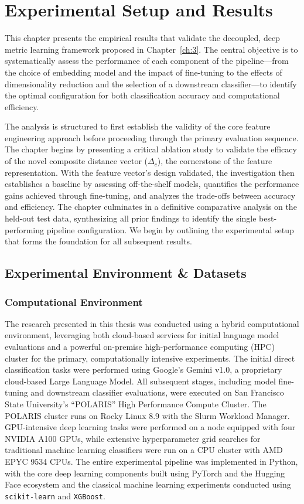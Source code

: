 \chapter{Experimental Setup and Results}\label{ch:4}
This chapter presents the empirical results that validate the decoupled, deep metric learning framework proposed in Chapter~\ref{ch:3}. The central objective is to systematically assess the performance of each component of the pipeline—from the choice of embedding model and the impact of fine-tuning to the effects of dimensionality reduction and the selection of a downstream classifier—to identify the optimal configuration for both classification accuracy and computational efficiency.

The analysis is structured to first establish the validity of the core feature engineering approach before proceeding through the primary evaluation sequence. The chapter begins by presenting a critical ablation study to validate the efficacy of the novel composite distance vector (\(\Delta_c\)), the cornerstone of the feature representation. With the feature vector's design validated, the investigation then establishes a baseline by assessing off-the-shelf models, quantifies the performance gains achieved through fine-tuning, and analyzes the trade-offs between accuracy and efficiency. The chapter culminates in a definitive comparative analysis on the held-out test data, synthesizing all prior findings to identify the single best-performing pipeline configuration. We begin by outlining the experimental setup that forms the foundation for all subsequent results.

\section{Experimental Environment \& Datasets}\label{ch:4.1}

\subsection{Computational Environment}\label{ch:4.1.1}
The research presented in this thesis was conducted using a hybrid computational environment, leveraging both cloud-based services for initial language model evaluations and a powerful on-premise high-performance computing (HPC) cluster for the primary, computationally intensive experiments. The initial direct classification tasks were performed using Google's Gemini v1.0, a proprietary cloud-based Large Language Model. All subsequent stages, including model fine-tuning and downstream classifier evaluations, were executed on San Francisco State University's ``POLARIS'' High Performance Compute Cluster. The POLARIS cluster runs on Rocky Linux 8.9 with the Slurm Workload Manager. GPU-intensive deep learning tasks were performed on a node equipped with four NVIDIA A100 GPUs, while extensive hyperparameter grid searches for traditional machine learning classifiers were run on a CPU cluster with AMD EPYC 9534 CPUs. The entire experimental pipeline was implemented in Python, with the core deep learning components built using PyTorch and the Hugging Face ecosystem and the classical machine learning experiments conducted using \verb|scikit-learn| and \verb|XGBoost|.

